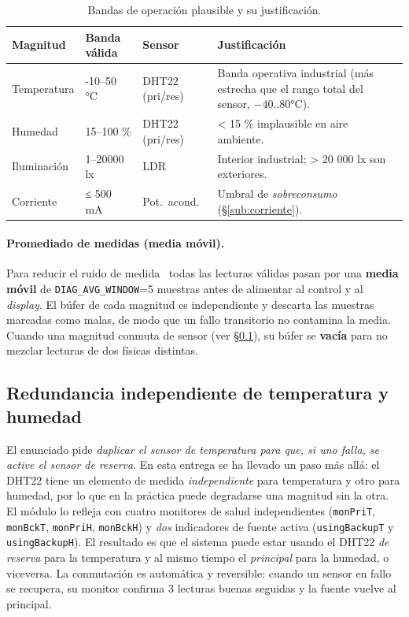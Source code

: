 \begin{table}[H]
  \centering
  \small
  \begin{tabular}{p{} p{} p{} p{}}
    \toprule
    \textbf{Magnitud} & \textbf{Banda válida} & \textbf{Sensor} & \textbf{Justificación} \\
    \midrule
    Temperatura  & -10–50 °C & DHT22 (pri/res)
                 & Banda operativa industrial (más estrecha que el rango total
                   del sensor, −40..80°C). \\
    Humedad      & 15–100 \% & DHT22 (pri/res)
                 & < 15 \% implausible en aire ambiente. \\
    Iluminación  & 1–20000 lx     & LDR
                 & Interior industrial; > 20 000 lx son exteriores. \\
    Corriente    & ≤ 500 mA & Pot.\ acond.
                 & Umbral de \emph{sobreconsumo} (§\ref{sub:corriente}). \\
    \bottomrule
  \end{tabular}
  \caption{Bandas de operación plausible y su justificación.}
  \label{tab:bandas}
\end{table}

\paragraph{Promediado de medidas (media móvil).}
\label{sub:avg}

Para reducir el ruido de medida~\cite{corona2014instrumentacion} todas las
lecturas válidas pasan por una \textbf{media móvil} de
\texttt{DIAG\_AVG\_WINDOW}=5 muestras antes de alimentar al control y al
\emph{display}. El búfer de cada magnitud es independiente y descarta las
muestras marcadas como malas, de modo que un fallo transitorio no contamina
la media. Cuando una magnitud conmuta de sensor (ver §\ref{sub:redund}), su
búfer se \textbf{vacía} para no mezclar lecturas de dos físicas distintas.

\subsection{Redundancia independiente de temperatura y humedad}\label{sub:redund}

El enunciado pide \emph{duplicar el sensor de temperatura para que, si uno
falla, se active el sensor de reserva}. En esta entrega se ha llevado un paso
más allá: el DHT22 tiene un elemento de medida \emph{independiente} para
temperatura y otro para humedad, por lo que en la práctica puede degradarse
una magnitud sin la otra. El módulo lo refleja con cuatro monitores de salud
independientes (\texttt{monPriT}, \texttt{monBckT}, \texttt{monPriH},
\texttt{monBckH}) y \emph{dos} indicadores de fuente activa
(\texttt{usingBackupT} y \texttt{usingBackupH}). El resultado es que el
sistema puede estar usando el DHT22 \emph{de reserva} para la temperatura y
al mismo tiempo el \emph{principal} para la humedad, o viceversa. La
conmutación es automática y reversible: cuando un sensor en fallo se
recupera, su monitor confirma 3 lecturas buenas seguidas y la fuente vuelve
al principal.

